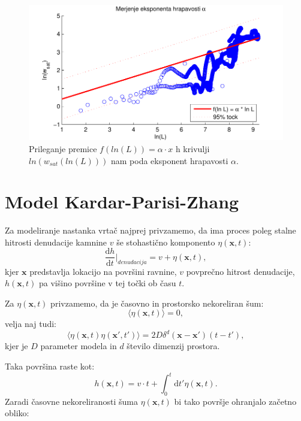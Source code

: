 \documentclass[a4paper, twoside, 12pt]{book}
\begin{document}
\begin{figure}[h]
  \begin{center}
    \includegraphics{slike/menisija-alfa.pdf}
  \end{center}
  \caption{Prileganje premice $f(ln(L)) = \alpha \cdot x$ h krivulji $ln(w_{sat}(ln(L)))$ nam poda eksponent hrapavosti $\alpha$.}
  \label{fig:menisija-alfa}
\end{figure}


    \section{Model Kardar-Parisi-Zhang}

    Za modeliranje nastanka vrtač najprej privzamemo, da ima proces poleg stalne hitrosti denudacije kamnine $v$ še stohastično komponento $\eta(\mathbf{x},t)$:
\begin{equation}
  \frac{\mathrm{d} h}{\mathrm{d} t} \bigg|_{denudacija} = v + \eta(\mathbf{x},t),
\end{equation}
kjer $\mathbf{x}$ predstavlja lokacijo na površini ravnine, $v$ povprečno hitrost denudacije, $h(\mathbf{x},t)$ pa višino površine v tej točki ob času $t$. 

Za $\eta (\mathbf{x},t)$ privzamemo, da je časovno in prostorsko nekoreliran šum: 
\begin{equation} 
  \langle \eta(\mathbf{x},t) \rangle=0,
\end{equation}
velja naj tudi:
\begin{equation}
  \langle \eta(\mathbf{x},t) \eta(\mathbf{x'},t')\rangle = 2 D \delta^d(\mathbf{x}-\mathbf{x'})(t-t'),
\end{equation}
kjer je $D$ parameter modela in $d$ število dimenzij prostora.

Taka površina raste kot:
\begin{equation}
  h(\mathbf{x},t) = v \cdot t + \int_0^t \mathrm{d} t' \eta (\mathbf{x},t).
\end{equation}
Zaradi časovne nekoreliranosti šuma $\eta({\mathbf{x},t})$ bi tako površje ohranjalo začetno obliko:
\end{document}
